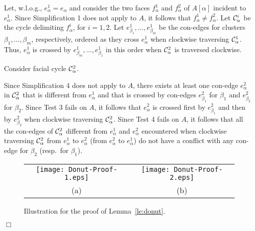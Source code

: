 \documentclass[letter,runningheads]{llncs}
\renewenvironment{proof}
{{\em Proof.\ }}{\hspace*{\fill}$\Box$\par\vspace{2mm}}
\begin{document}
\begin{proof}
Let, w.l.o.g., $e^1_{\alpha}=e_{\alpha}$ and consider the two faces $f^1_{\alpha}$ and $f^2_{\alpha}$ of $A[\alpha]$ incident to $e^1_{\alpha}$. Since {\sc Simplification 1} does not apply to $A$, it follows that $f^1_{\alpha}\neq f^2_{\alpha}$. Let ${\cal C}^i_{\alpha}$ be the cycle delimiting $f^i_{\alpha}$, for $i=1,2$. Let $e^1_{\beta_1},\dots,e^1_{\beta_m}$ be the con-edges for clusters $\beta_1,\dots,\beta_m$, respectively, ordered as they cross $e^1_{\alpha}$ when clockwise traversing ${\cal C}^1_{\alpha}$. Thus, $e^1_{\alpha}$ is crossed by $e^1_{\beta_m},\dots,e^1_{\beta_1}$ in this order when ${\cal C}^2_{\alpha}$ is traversed clockwise.

Consider facial cycle ${\cal C}^2_{\alpha}$.

Since {\sc Simplification 4} does not apply to $A$, there exists at least one con-edge $e^2_{\alpha}$ in ${\cal C}^2_{\alpha}$ that is different from $e^1_{\alpha}$ and that is crossed by con-edges $e^2_{\beta_1}$ for $\beta_1$ and $e^2_{\beta_2}$ for $\beta_2$. Since {\sc Test 3} fails on $A$, it follows that $e^2_{\alpha}$ is crossed first by $e^2_{\beta_1}$ and then by $e^2_{\beta_2}$ when clockwise traversing ${\cal C}^2_{\alpha}$. Since {\sc Test 4} fails on $A$, it follows that all the con-edges of ${\cal C}^2_{\alpha}$ different from $e^1_{\alpha}$ and $e^{2}_{\alpha}$ encountered when clockwise traversing ${\cal C}^2_{\alpha}$ from $e^1_{\alpha}$ to $e^{2}_{\alpha}$ (from $e^2_{\alpha}$ to $e^1_{\alpha}$) do not have a conflict with any con-edge for $\beta_2$ (resp.\ for $\beta_1$).

\begin{figure}[tb]
\begin{center}
\begin{tabular}{c c}
\mbox{\texttt{[image: Donut-Proof-1.eps]}} \hspace{1cm} &
\mbox{\texttt{[image: Donut-Proof-2.eps]}}\\
(a) \hspace{1cm} & (b)
\end{tabular}
\caption{Illustration for the proof of Lemma~\ref{le:donut}.}
\label{fig:donut-proof}
\end{center}
\end{figure}



\end{proof}
\end{document}
